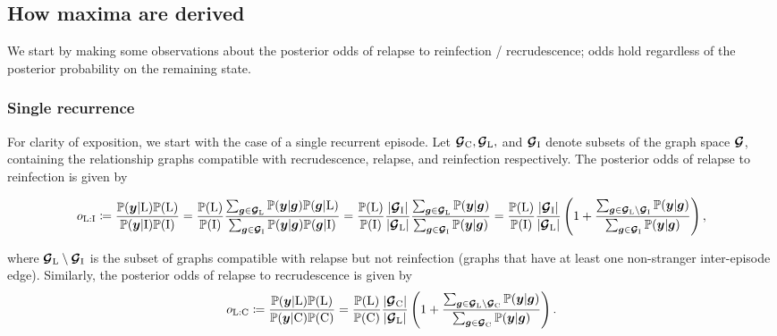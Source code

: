 \documentclass{article}
\begin{document}
\subsection*{How maxima are derived}

We start by making some observations about the posterior odds of relapse to reinfection / recrudescence; odds hold regardless of the posterior probability on the remaining state. 

\subsubsection*{Single recurrence}

For clarity of exposition, we start with the case of a single recurrent episode. Let $\bm{\mathcal{G}}_{\mathrm{C}}, \bm{\mathcal{G}}_{\mathrm{L}},$ and $\bm{\mathcal{G}}_{\mathrm{I}}$ denote subsets of the graph space $\bm{\mathcal{G}}$, containing the relationship graphs compatible with recrudescence, relapse, and reinfection respectively. The posterior odds of relapse to reinfection is given by

\small
\begin{equation*}
o_{\mathrm{L}:\mathrm{I}} \coloneqq 
\frac{\mathbb{P}(\bm{y} | \mathrm{L})\mathbb{P}(\mathrm{L})}{\mathbb{P}(\bm{y} | \mathrm{I})\mathbb{P}(\mathrm{I})} =
\frac{\mathbb{P}(\mathrm{L})}{\mathbb{P}(\mathrm{I})}
\frac{\sum_{\bm{g}\in\bm{\mathcal{G}}_{\mathrm{L}}}\mathbb{P}(\bm{y} | \bm{g})\mathbb{P}(\bm{g} | \mathrm{L})}{\sum_{\bm{g}\in\bm{\mathcal{G}}_{\mathrm{I}}}\mathbb{P}(\bm{y} | \bm{g})\mathbb{P}(\bm{g} | \mathrm{I})} =
\frac{\mathbb{P}(\mathrm{L})}{\mathbb{P}(\mathrm{I})}
\frac{| \bm{\mathcal{G}}_{\mathrm{I}} |}{| \bm{\mathcal{G}}_{\mathrm{L}} |} \frac{\sum_{\bm{g}\in\bm{\mathcal{G}}_{\mathrm{L}}}\mathbb{P}(\bm{y} | \bm{g})}{\sum_{\bm{g}\in\bm{\mathcal{G}}_{\mathrm{I}}}\mathbb{P}(\bm{y} | \bm{g})} = 
\frac{\mathbb{P}(\mathrm{L})}{\mathbb{P}(\mathrm{I})}
\frac{| \bm{\mathcal{G}}_{\mathrm{I}} |}{| \bm{\mathcal{G}}_{\mathrm{L}} |} \left(1 + \frac{\sum_{\bm{g}\in\bm{\mathcal{G}}_{\mathrm{L}}\setminus\bm{\mathcal{G}}_{\mathrm{I}}}\mathbb{P}(\bm{y} | \bm{g})}{\sum_{\bm{g}\in\bm{\mathcal{G}}_{\mathrm{I}}}\mathbb{P}(\bm{y} | \bm{g})}\right), 
\end{equation*}
\normalsize

where $\bm{\mathcal{G}}_{\mathrm{L}}\setminus\bm{\mathcal{G}}_{\mathrm{I}}$ is the subset of graphs compatible with relapse but not reinfection (graphs that have at least one non-stranger inter-episode edge). Similarly, the posterior odds of relapse to recrudescence is given by
\begin{equation*}
o_{\mathrm{L}:\mathrm{C}} \coloneqq 
\frac{\mathbb{P}(\bm{y} | \mathrm{L})\mathbb{P}(\mathrm{L})}{\mathbb{P}(\bm{y} | \mathrm{C})\mathbb{P}(\mathrm{C})} = 
\frac{\mathbb{P}(\mathrm{L})}{\mathbb{P}(\mathrm{C})}
\frac{| \bm{\mathcal{G}}_{\mathrm{C}} |}{| \bm{\mathcal{G}}_{\mathrm{L}} |} \left(1 + \frac{\sum_{\bm{g}\in\bm{\mathcal{G}}_{\mathrm{L}}\setminus\bm{\mathcal{G}}_{\mathrm{C}}}\mathbb{P}(\bm{y} | \bm{g})}{\sum_{\bm{g}\in\bm{\mathcal{G}}_{\mathrm{C}}}\mathbb{P}(\bm{y} | \bm{g})}\right).
\end{equation*}
\end{document}
